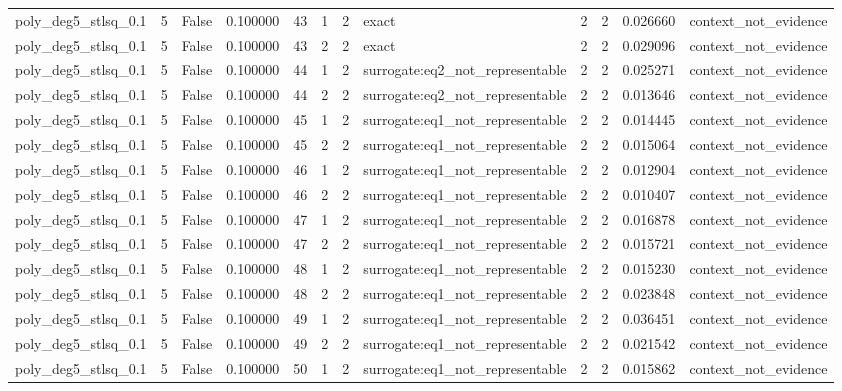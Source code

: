 \begin{tabular}{lrrrrrrlrrrl}
poly\_deg5\_stlsq\_0.1 & 5 & False & 0.100000 & 43 & 1 & 2 & exact & 2 & 2 & 0.026660 & context\_not\_evidence \\
poly\_deg5\_stlsq\_0.1 & 5 & False & 0.100000 & 43 & 2 & 2 & exact & 2 & 2 & 0.029096 & context\_not\_evidence \\
poly\_deg5\_stlsq\_0.1 & 5 & False & 0.100000 & 44 & 1 & 2 & surrogate:eq2\_not\_representable & 2 & 2 & 0.025271 & context\_not\_evidence \\
poly\_deg5\_stlsq\_0.1 & 5 & False & 0.100000 & 44 & 2 & 2 & surrogate:eq2\_not\_representable & 2 & 2 & 0.013646 & context\_not\_evidence \\
poly\_deg5\_stlsq\_0.1 & 5 & False & 0.100000 & 45 & 1 & 2 & surrogate:eq1\_not\_representable & 2 & 2 & 0.014445 & context\_not\_evidence \\
poly\_deg5\_stlsq\_0.1 & 5 & False & 0.100000 & 45 & 2 & 2 & surrogate:eq1\_not\_representable & 2 & 2 & 0.015064 & context\_not\_evidence \\
poly\_deg5\_stlsq\_0.1 & 5 & False & 0.100000 & 46 & 1 & 2 & surrogate:eq1\_not\_representable & 2 & 2 & 0.012904 & context\_not\_evidence \\
poly\_deg5\_stlsq\_0.1 & 5 & False & 0.100000 & 46 & 2 & 2 & surrogate:eq1\_not\_representable & 2 & 2 & 0.010407 & context\_not\_evidence \\
poly\_deg5\_stlsq\_0.1 & 5 & False & 0.100000 & 47 & 1 & 2 & surrogate:eq1\_not\_representable & 2 & 2 & 0.016878 & context\_not\_evidence \\
poly\_deg5\_stlsq\_0.1 & 5 & False & 0.100000 & 47 & 2 & 2 & surrogate:eq1\_not\_representable & 2 & 2 & 0.015721 & context\_not\_evidence \\
poly\_deg5\_stlsq\_0.1 & 5 & False & 0.100000 & 48 & 1 & 2 & surrogate:eq1\_not\_representable & 2 & 2 & 0.015230 & context\_not\_evidence \\
poly\_deg5\_stlsq\_0.1 & 5 & False & 0.100000 & 48 & 2 & 2 & surrogate:eq1\_not\_representable & 2 & 2 & 0.023848 & context\_not\_evidence \\
poly\_deg5\_stlsq\_0.1 & 5 & False & 0.100000 & 49 & 1 & 2 & surrogate:eq1\_not\_representable & 2 & 2 & 0.036451 & context\_not\_evidence \\
poly\_deg5\_stlsq\_0.1 & 5 & False & 0.100000 & 49 & 2 & 2 & surrogate:eq1\_not\_representable & 2 & 2 & 0.021542 & context\_not\_evidence \\
poly\_deg5\_stlsq\_0.1 & 5 & False & 0.100000 & 50 & 1 & 2 & surrogate:eq1\_not\_representable & 2 & 2 & 0.015862 & context\_not\_evidence \\

\end{tabular}
